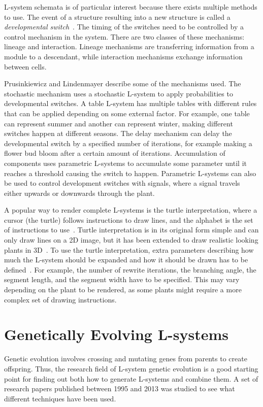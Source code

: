 \gls{L-system} schemata is of particular interest because there exists multiple methods to use.
The event of a structure resulting into a new structure is called a {\it developmental switch}~\cite{2012Prusinkiewicz}.
The timing of the switches need to be controlled by a control mechanism in the system.
There are two classes of these mechanisms: lineage and interaction.
Lineage mechanisms are transferring information from a module to a descendant, while interaction mechanisms exchange information between cells.

Prusinkiewicz and Lindenmayer describe some of the mechanisms used.
The stochastic mechanism uses a stochastic \gls{L-system} to apply probabilities to developmental switches.
A table \gls{L-system} has multiple tables with different rules that can be applied depending on some external factor.
For example, one table can represent summer and another can represent winter, making different switches happen at different seasons.
The delay mechanism can delay the developmental switch by a specified number of iterations, for example making a flower bud bloom after a certain amount of iterations.
Accumulation of components uses parametric \glspl{L-system} to accumulate some parameter until it reaches a threshold causing the switch to happen.
Parametric \glspl{L-system} can also be used to control development switches with signals, where a signal travels either upwards or downwards through the plant.~\cite{2012Prusinkiewicz}

A popular way to render complete \glspl{L-system} is the turtle interpretation, where a cursor (the turtle) follows instructions to draw lines, and the alphabet is the set of instructions to use~\cite{2012Prusinkiewicz}.
Turtle interpretation is in its original form simple and can only draw lines on a 2D image, but it has been extended to draw realistic looking plants in 3D~\cite{2012Prusinkiewicz}.
To use the turtle interpretation, extra parameters describing how much the \gls{L-system} should be expanded and how it should be drawn has to be defined~\cite{2012Prusinkiewicz}.
For example, the number of rewrite iterations, the branching angle, the segment length, and the segment width have to be specified.
This may vary depending on the plant to be rendered, as some plants might require a more complex set of drawing instructions.

\section{Genetically Evolving L-systems}
Genetic evolution involves crossing and mutating genes from parents to create offspring.
Thus, the research field of \gls{L-system} genetic evolution is a good starting point for finding out both how to generate \glspl{L-system} and combine them.
A set of research papers published between 1995 and 2013 was studied to see what different techniques have been used.


